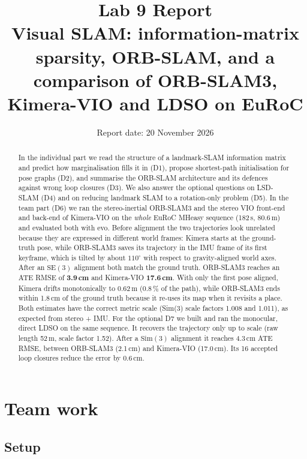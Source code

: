 \documentclass[11pt,a4paper]{article}
\title{Lab 9 Report\\[0.3em]\large Visual SLAM: information-matrix sparsity, ORB-SLAM, and a
comparison of ORB-SLAM3, Kimera-VIO and LDSO on EuRoC}
\author{\studentname}
\date{Report date: 20 November 2026}
\DeclareRobustCommand{\code}[1]{\begingroup\ttfamily\codebreaks#1\endgroup}
\newcommand{\codebreaks}{\renewcommand{\_}{\textunderscore\allowbreak}}
\begin{document}
\maketitle

\begin{abstract}
In the individual part we read the structure of a landmark-SLAM information matrix and
predict how marginalisation fills it in (D1), propose shortest-path initialisation for pose
graphs (D2), and summarise the ORB-SLAM architecture and its defences against wrong loop
closures (D3). We also answer the optional questions on LSD-SLAM (D4) and on reducing
landmark SLAM to a rotation-only problem (D5).
In the team part (D6) we ran the stereo-inertial ORB-SLAM3 and the stereo VIO front-end and
back-end of Kimera-VIO on the \emph{whole} EuRoC \code{MH\_01\_easy} sequence (182\,s, 80.6\,m)
and evaluated both with \code{evo}. Before alignment the two trajectories look unrelated
because they are expressed in different world frames: Kimera starts at the ground-truth pose,
while ORB-SLAM3 saves its trajectory in the IMU frame of its first keyframe, which is tilted
by about $110^\circ$ with respect to gravity-aligned world axes. After an $\mathrm{SE}(3)$ alignment
both match the ground truth. ORB-SLAM3 reaches an ATE RMSE of \textbf{3.9\,cm} and Kimera-VIO
\textbf{17.6\,cm}. With only the first pose aligned, Kimera drifts monotonically to 0.62\,m (0.8\,\% of
the path), while ORB-SLAM3 ends within 1.8\,cm of the ground truth because it re-uses its map
when it revisits a place. Both estimates have the correct metric scale (Sim(3) scale factors 1.008
and 1.011), as expected from stereo + IMU.
For the optional D7 we built and ran the monocular, direct LDSO on the same sequence. It recovers
the trajectory only up to scale (raw length 52\,m, scale factor 1.52). After a $\mathrm{Sim}(3)$
alignment it reaches 4.3\,cm ATE RMSE, between ORB-SLAM3 (2.1\,cm) and Kimera-VIO (17.0\,cm). Its 16
accepted loop closures reduce the error by 0.6\,cm.
\end{abstract}



\section{Team work}\label{sec:team}

\subsection{Setup}\label{sec:setup}
\end{document}
